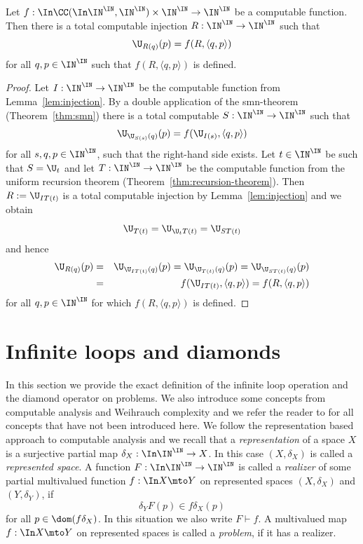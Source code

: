 \documentclass{lmcs}
\begin{document}
\begin{thm}
\label{thm:injective-recursion}
Let $f:\In\CC(\In\IN^\IN,\IN^\IN)\times\IN^\IN\to\IN^\IN$ be a computable function.
Then there is a total computable injection $R:\IN^\IN\to\IN^\IN$ such that
\[\U_{R(q)}(p)=f(R,\langle q,p\rangle)\]
for all $q,p\in\IN^\IN$ such that $f(R,\langle q,p\rangle)$ is defined.
\end{thm}
\begin{proof}
Let $I:\IN^\IN\to\IN^\IN$ be the computable function from Lemma~\ref{lem:injection}.
By a double application of the smn-theorem (Theorem~\ref{thm:smn}) there is a total computable ${S:\IN^\IN\to\IN^\IN}$ such that
\[\U_{\U_{S(s)}(q)}(p)=f(\U_{I(s)},\langle q,p\rangle)\]
for all $s,q,p\in\IN^\IN$, such that the right-hand side exists. 
Let $t\in\IN^\IN$ be such that $S=\U_t$ and let $T:\IN^\IN\to\IN^\IN$ be the computable
function from the uniform recursion theorem (Theorem~\ref{thm:recursion-theorem}).
Then $R:=\U_{IT(t)}$ is a total computable injection by Lemma~\ref{lem:injection} and we obtain
\[\U_{T(t)}=\U_{\U_tT(t)}=\U_{ST(t)}\]
and hence
\begin{eqnarray*}
\U_{R(q)}(p) 
&=&\U_{\U_{IT(t)}(q)}(p)=\U_{\U_{T(t)}(q)}(p)=\U_{\U_{ST(t)}(q)}(p)\\
&=&f(\U_{IT(t)},\langle q,p\rangle)=f(R,\langle q,p\rangle)
\end{eqnarray*}
for all $q,p\in\IN^\IN$ for which $f(R,\langle q,p\rangle)$ is defined.
\end{proof}


\section{Infinite loops and diamonds}
\label{sec:definitions}

In this section we provide the exact definition of the infinite loop operation and the diamond operator on problems. 
We also introduce some concepts from computable analysis and Weihrauch complexity
and we refer the reader to \cite{BH21,Wei00} for all concepts that have not been introduced here.
We follow the representation based approach to computable analysis and we recall
that a {\em representation} of a space $X$ is a surjective partial map $\delta_X:\In\IN^\IN\to X$.
In this case $(X,\delta_X)$ is called a {\em represented space}.
A function $F:\In\IN^\IN\to\IN^\IN$
is called a {\em realizer} of some partial multivalued function $f:\In X\mto Y$ on represented spaces $(X,\delta_X)$ and $(Y,\delta_Y)$, if
\[\delta_YF(p)\in f\delta_X(p)\]
for all $p\in\dom(f\delta_X)$. In this situation we also write $F\vdash f$.
A multivalued map $f:\In X\mto Y$ on represented spaces is called a {\em problem}, if it has a realizer.
\end{document}

